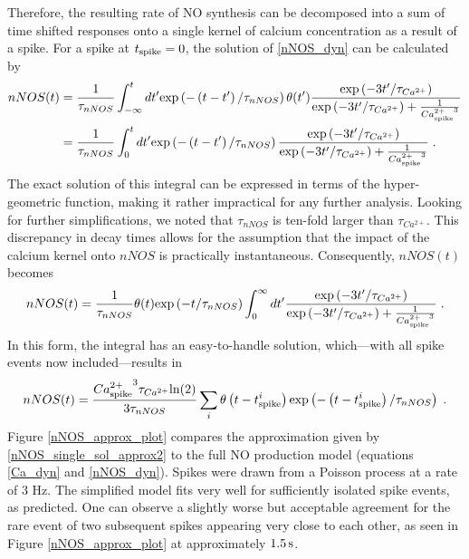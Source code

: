 \documentclass[10pt,a4paper]{article}
\begin{document}
Therefore, the resulting rate of NO synthesis can be decomposed into a sum of time shifted responses onto a single kernel of calcium concentration as a result of a spike. For a spike at $t_{\rm spike}=0$, the solution of \eqref{nNOS_dyn} can be calculated by
\begin{equation}
\begin{split}
nNOS(t) &= \frac{1}{\tau_{nNOS}}\int_{-\infty}^t dt' \mathrm{exp} \left( - \left( t-t' \right) /\tau_{nNOS} \right)  \mathrm{\theta} (t') \frac{\mathrm{exp} \left( -3t'/\tau_{Ca^{2+}} \right) }{\mathrm{exp} \left( -3t'/\tau_{Ca^{2+}} \right) + \frac{1}{{Ca^{2+}_{\rm spike}}^3}} \\
&= \frac{1}{\tau_{nNOS}}\int_{0}^t dt' \mathrm{exp} \left( - \left( t-t' \right) /\tau_{nNOS} \right)  \frac{\mathrm{exp} \left( -3t'/\tau_{Ca^{2+}} \right) }{\mathrm{exp} \left( -3t'/\tau_{Ca^{2+}} \right) + \frac{1}{{Ca^{2+}_{\rm spike}}^3}}\;.
\end{split}\label{nNOS_single_sol}
\end{equation}
The exact solution of this integral can be expressed in terms of the hyper-geometric function, making it rather impractical for any further analysis. Looking for further simplifications, we noted that $\tau_{nNOS}$ is ten-fold larger than $\tau_{Ca^{2+}}$. This discrepancy in decay times allows for the assumption that the impact of the calcium kernel onto $nNOS$ is practically instantaneous. Consequently, $nNOS(t)$ becomes
\begin{equation}
nNOS(t) = \frac{1}{\tau_{nNOS}} \mathrm{\theta}(t) \mathrm{exp} \left( -t/\tau_{nNOS} \right) \int_{0}^\infty dt' \frac{\mathrm{exp} \left( -3t'/\tau_{Ca^{2+}} \right) }{\mathrm{exp} \left( -3t'/\tau_{Ca^{2+}} \right) + \frac{1}{{Ca^{2+}_{\rm spike}}^3}}\;.
\label{nNOS_single_sol_approx1}
\end{equation}
In this form, the integral has an easy-to-handle solution, which---with all spike events now included---results in
\begin{equation}
nNOS(t) = \frac{{Ca^{2+}_{\rm spike}}^3 \tau_{Ca^{2+}} \mathrm{ln} (2) }{3\tau_{nNOS}} \sum_i \mathrm{\theta} \left( t-t^i_{\rm spike} \right) \mathrm{exp} \left( - \left( t-t^i_{\rm spike} \right) /\tau_{nNOS} \right) \;.
\label{nNOS_single_sol_approx2}
\end{equation}
Figure \ref{nNOS_approx_plot} compares the approximation given by \eqref{nNOS_single_sol_approx2} to the full NO production model (equations \eqref{Ca_dyn} and \eqref{nNOS_dyn}). Spikes were drawn from a Poisson process at a rate of 3 Hz. The simplified model fits very well for sufficiently isolated spike events, as predicted. One can observe a slightly worse but acceptable agreement for the rare event of two subsequent spikes appearing very close to each other, as seen in Figure \ref{nNOS_approx_plot} at approximately $\rm 1.5\, s$.
\end{document}
